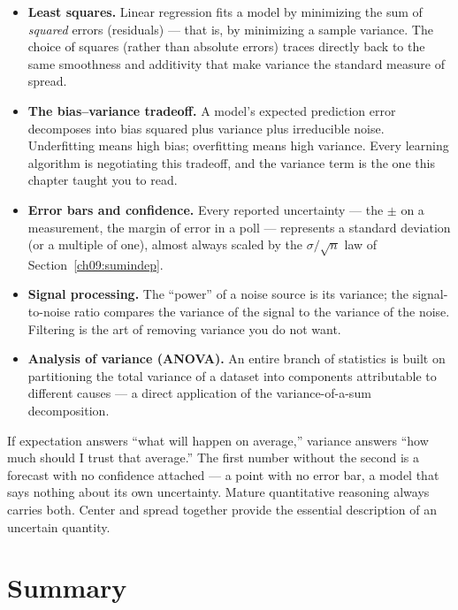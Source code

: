 \begin{itemize}
  \item \textbf{Least squares.} Linear regression fits a model by
        minimizing the sum of \emph{squared} errors (residuals) --- that is, by
        minimizing a sample variance. The choice of squares (rather than absolute
        errors) traces directly back to the same smoothness and additivity
        that make variance the standard measure of spread.
  \item \textbf{The bias--variance tradeoff.} A model's expected prediction
        error decomposes into bias squared plus variance plus irreducible
        noise. Underfitting means high bias; overfitting means high variance.
        Every learning algorithm is negotiating this tradeoff, and
        the variance term is the one this chapter taught you to read.
  \item \textbf{Error bars and confidence.} Every reported uncertainty ---
        the $\pm$ on a measurement, the margin of error in a poll --- represents a
        standard deviation (or a multiple of one), almost always
        scaled by the $\sigma/\sqrt n$ law of Section~\ref{ch09:sumindep}.
  \item \textbf{Signal processing.} The ``power'' of a noise source is its
        variance; the signal-to-noise ratio compares the variance of the
        signal to the variance of the noise. Filtering is the art of removing
        variance you do not want.
  \item \textbf{Analysis of variance (ANOVA).} An entire branch of statistics
        is built on partitioning the total variance of a dataset into
        components attributable to different causes --- a direct application
        of the variance-of-a-sum decomposition.
\end{itemize}

\begin{aestheticbox}
If expectation answers ``what will happen on average,'' variance answers ``how
much should I trust that average.'' The first number without the second is a
forecast with no confidence attached --- a point with no error bar, a model
that says nothing about its own uncertainty. Mature quantitative reasoning
always carries both. Center and spread together provide the essential
description of an uncertain quantity.
\end{aestheticbox}

\section*{Summary}

